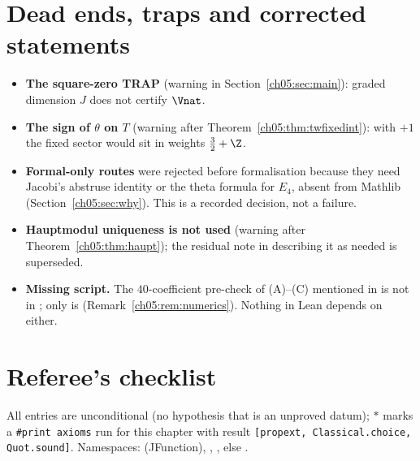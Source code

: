 \section{Dead ends, traps and corrected statements}\label{ch05:sec:dead}

\begin{itemize}
  \item \textbf{The square-zero TRAP} (warning in Section~\ref{ch05:sec:main}): graded dimension $J$ does
    not certify $\Vnat$.
  \item \textbf{The sign of $\theta$ on $T$} (warning after Theorem~\ref{ch05:thm:twfixedint}): with $+1$ the
    fixed sector would sit in weights $\tfrac32+\Z$.
  \item \textbf{Formal-only routes} were rejected before formalisation because they need Jacobi's abstruse
    identity or the theta formula for $E_4$, absent from Mathlib (Section~\ref{ch05:sec:why}). This is
    a recorded decision, not a failure.
  \item \textbf{Hauptmodul uniqueness is not used} (warning after Theorem~\ref{ch05:thm:haupt}); the residual
    note in  describing it as needed is superseded.
  \item \textbf{Missing script.} The $40$-coefficient pre-check of (A)--(C) mentioned in
     is not in ; only  is
    (Remark~\ref{ch05:rem:numerics}). Nothing in Lean depends on either.
\end{itemize}

\section{Referee's checklist}\label{ch05:sec:checklist}

All entries are unconditional (no hypothesis that is an unproved datum); $\ast$ marks a
\texttt{\#print axioms} run for this chapter with result \texttt{[propext, Classical.choice, Quot.sound]}.
Namespaces:  (JFunction), , , else .


